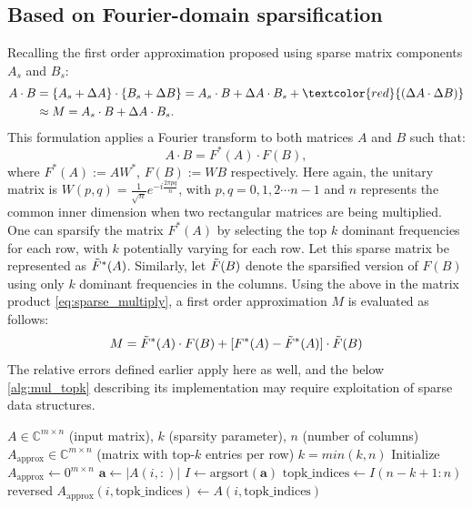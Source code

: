 \documentclass[onefignum,onetabnum]{siamart171218}
\begin{document}
\subsection{Based on Fourier-domain sparsification} \label{sec:Fourier_sparsification}
Recalling the first order approximation proposed using sparse matrix components $A_s$ and $B_s$:
\begin{align}
    A \cdot B  &= \{A_s + \Delta A\} \cdot \{B_s + \Delta B\} = A_s \cdot B + \Delta A \cdot B_s + \textcolor{red}{(\Delta A \cdot \Delta B)} \\
    &\approx M = A_s \cdot B + \Delta A \cdot B_s.
    \label{eq:sparse_multiply}
\end{align}
This formulation applies a Fourier transform to both matrices $A$ and $B$ such that:
\begin{equation*}
     A \cdot B = F^*(A) \cdot F(B),   
\end{equation*}
where $F^*(A) := AW^*$, $F(B) := WB$ respectively. Here again, the unitary matrix is $W(p,q) = \frac{1}{\sqrt{n}}e^{-i \frac{2\pi pq}{n}}$, with $p,q=0,1,2\cdots n-1$ and $n$ represents the common inner dimension when two rectangular matrices are being multiplied. One can sparsify the matrix $F^*(A)$ by selecting the top $k$ dominant frequencies for each row, with $k$ potentially varying for each row. Let this sparse matrix be represented as $\Tilde{F}^*(A)$. Similarly, let $\Tilde{F}(B)$ denote the sparsified version of $F(B)$ using only $k$ dominant frequencies in the columns. Using the above in the matrix product \eqref{eq:sparse_multiply}, a first order approximation $M$ is evaluated as follows:
\begin{equation*}
 M = \Tilde{F}^*(A) \cdot F(B) + [F^*(A) - \Tilde{F}^*(A)] \cdot \Tilde{F}(B)   
\end{equation*}
The relative errors defined earlier apply here as well, and the below \cref{alg:mul_topk} describing its implementation may require exploitation of sparse data structures.

\begin{algorithm}
\caption{Top-$k$ Matrix Approximation by Row} \label{alg:topk}
\begin{algorithmic}[1]
\Require $A \in \mathbb{C}^{m \times n}$ (input matrix), $k$ (sparsity parameter), $n$ (number of columns)
\Ensure $A_{\text{approx}} \in \mathbb{C}^{m \times n}$ (matrix with top-$k$ entries per row)
\State $k=min(k,n)$ 
\State Initialize $A_{\text{approx}} \gets 0^{m \times n}$ 
    \State $\mathbf{a} \gets |A(i,:)|$ 
    \State $ I \gets \text{argsort}(\mathbf{a})$ 
    \State $\text{topk\_indices} \gets I(n-k+1:n)$ reversed 
    \State $A_{\text{approx}}(i, \text{topk\_indices}) \gets A(i, \text{topk\_indices})$ 
\EndFor
\end{algorithmic}
\end{algorithm}
\end{document}
